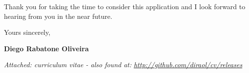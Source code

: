 \documentclass[]{friggeri-cover-letter}
\begin{document}
Thank you for taking the time to consider this application and I look forward to hearing from you in the near future.

\vfill

\hfill Yours sincerely,

\hfill \textbf{Diego Rabatone Oliveira}

\vfill

\footnotesize{\thinfont\color{lightgray}\textit{Attached: curriculum vitae - also found at:} \textit{\url{http://github.com/diraol/cv/releases}}}
\end{document}
